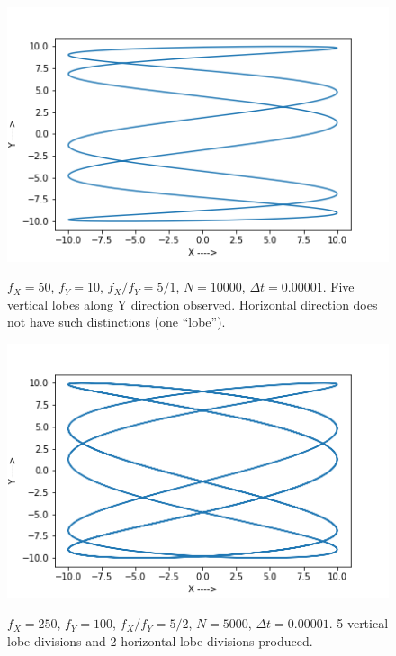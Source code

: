 \documentclass{report}
\begin{document}
\begin{figure}[H]
	\centering
	\includegraphics[width = \textwidth]{ratio3.png}
	\label{ratio3}
	\caption{$f_X=50$, $f_Y=10$, $f_X/f_Y=5/1$, $N=10000$, $\Delta t=0.00001$. Five vertical lobes along Y direction observed. Horizontal direction does not have such distinctions (one ``lobe'').}
\end{figure}
\begin{figure}[H]
	\centering
	\includegraphics[width = \textwidth]{ratio4.png}
	\label{ratio4}
	\caption{$f_X=250$, $f_Y=100$, $f_X/f_Y=5/2$, $N=5000$, $\Delta t=0.00001$. 5 vertical lobe divisions and 2 horizontal lobe divisions produced.}
\end{figure}
\end{document}
